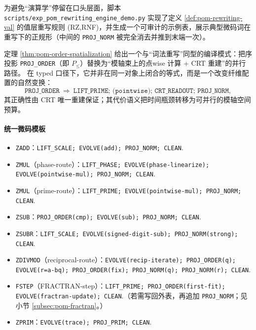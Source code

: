 \begin{remark}\label{rem:pom-rewriting-engine-demo}
为避免“演算学”停留在口头层面，脚本 \texttt{scripts/exp\_pom\_rewriting\_engine\_demo.py} 实现了定义 \ref{def:pom-rewriting-val} 的值层重写规则 (RZ,RNF)，并生成一个可审计的示例表，展示典型微码词在重写下的正规形（中间的 \texttt{PROJ\_NORM} 被完全消去并推到末端一次）。

\end{remark}

\begin{remark}[序投影的空间化作为编译重写模式]\label{rem:pom-rewriting-order-spatialize}
定理 \ref{thm:pom-order-spatialization} 给出一个与“词法重写”同型的编译模式：把序投影 \texttt{PROJ\_ORDER}（即 \(P_{\le}\)）替换为“模轴束上的点wise 计算 + CRT 重建”的并行路径。
在 typed 口径下，它并非在同一对象上闭合的等式，而是一个改变纤维配置的自然变换：
\[
\texttt{PROJ\_ORDER}
\ \Longrightarrow\
\texttt{LIFT\_PRIME; (pointwise);\ CRT\_READOUT; PROJ\_NORM},
\]
其正确性由 CRT 唯一重建保证；其代价语义把时间瓶颈转移为可并行的模轴空间预算。
\end{remark}

\paragraph{统一微码模板}
\begin{itemize}
  \item \texttt{ZADD}：\texttt{LIFT\_SCALE; EVOLVE(add); PROJ\_NORM; CLEAN}.
  \item \texttt{ZMUL}（phase-route）：\texttt{LIFT\_PHASE; EVOLVE(phase-linearize); EVOLVE(pointwise-mul); PROJ\_NORM; CLEAN}.
  \item \texttt{ZMUL}（prime-route）：\texttt{LIFT\_PRIME; EVOLVE(pointwise-mul); PROJ\_NORM; CLEAN}.
  \item \texttt{ZSUB}：\texttt{PROJ\_ORDER(cmp); EVOLVE(sub); PROJ\_NORM; CLEAN}.
  \item \texttt{ZSUBR}：\texttt{LIFT\_SCALE; EVOLVE(signed-digit-sub); PROJ\_NORM(strong); CLEAN}.
  \item \texttt{ZDIVMOD}（reciprocal-route）：\texttt{EVOLVE(recip-iterate); PROJ\_ORDER(q); EVOLVE(r=a-bq); PROJ\_ORDER(fix); PROJ\_NORM(q); PROJ\_NORM(r); CLEAN}.
  \item \texttt{FSTEP}（FRACTRAN-step）：\texttt{LIFT\_PRIME; PROJ\_ORDER(first-fit); EVOLVE(fractran-update); CLEAN}.（若需写回外表，再追加 \texttt{PROJ\_NORM}；见小节 \ref{subsec:pom-fractran}。）
  \item \texttt{ZPRIM}：\texttt{EVOLVE(trace); PROJ\_PRIM; CLEAN}.
\end{itemize}

